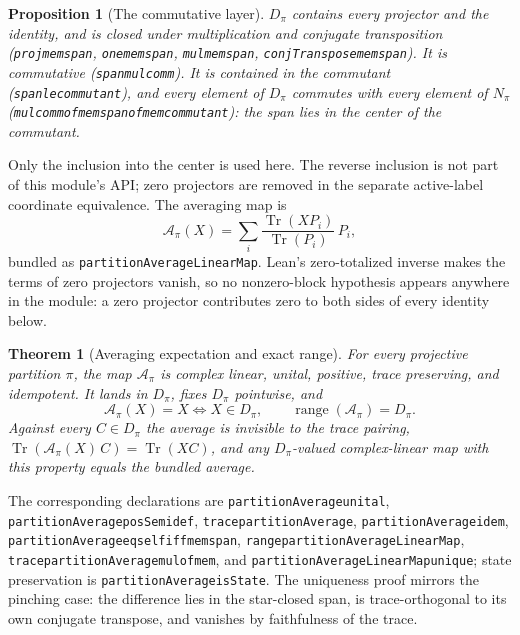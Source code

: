 \documentclass[11pt]{article}
\renewcommand{\_}{\textunderscore\allowbreak}
\newtheorem{theorem}{Theorem}
\newtheorem{proposition}{Proposition}
\theoremstyle{remark}
\newcommand{\Tr}{\operatorname{Tr}}
\newcommand{\avg}{\mathcal A}
\begin{document}
\begin{proposition}[The commutative layer]
\label{prop:span}
$D_\pi$ contains every projector and the identity, and is closed under
multiplication and conjugate transposition
(\texttt{proj\_mem\_span}, \texttt{one\_mem\_span},
\texttt{mul\_mem\_span}, \texttt{conjTranspose\_mem\_span}). It is
commutative (\texttt{span\_mul\_comm}). It is contained in the commutant
(\texttt{span\_le\_commutant}), and every element of $D_\pi$ commutes with
every element of $N_\pi$
(\texttt{mul\_comm\_of\_mem\_span\_of\_mem\_commutant}): the span lies in the
center of the commutant.
\end{proposition}

Only the inclusion into the center is used here. The reverse inclusion is not
part of this module's API; zero projectors are removed in the separate active-label
coordinate equivalence. The averaging map is
\[
 \avg_\pi(X)=\sum_i\frac{\Tr(XP_i)}{\Tr(P_i)}\,P_i,
\]
bundled as \texttt{partitionAverageLinearMap}. Lean's zero-totalized inverse
makes the terms of zero projectors vanish, so no nonzero-block hypothesis
appears anywhere in the module: a zero projector contributes zero to both
sides of every identity below.

\begin{theorem}[Averaging expectation and exact range]
\label{thm:average}
For every projective partition $\pi$, the map $\avg_\pi$ is complex linear,
unital, positive, trace preserving, and idempotent. It lands in $D_\pi$,
fixes $D_\pi$ pointwise, and
\[
 \avg_\pi(X)=X \Longleftrightarrow X\in D_\pi,
 \qquad
 \operatorname{range}(\avg_\pi)=D_\pi.
\]
Against every $C\in D_\pi$ the average is invisible to the trace pairing,
$\Tr(\avg_\pi(X)\,C)=\Tr(XC)$, and any $D_\pi$-valued complex-linear map with
this property equals the bundled average.
\end{theorem}

The corresponding declarations are
\texttt{partitionAverage\_unital},
\texttt{partitionAverage\_posSemidef},
\texttt{trace\_partitionAverage},
\texttt{partitionAverage\_idem},
\texttt{partitionAverage\_eq\_self\_iff\_mem\_span},
\texttt{range\_partitionAverageLinearMap},
\texttt{trace\_partitionAverage\_mul\_of\_mem}, and
\texttt{partitionAverageLinearMap\_unique}; state preservation is
\texttt{partitionAverage\_isState}. The uniqueness proof mirrors the pinching
case: the difference lies in the star-closed span, is trace-orthogonal to its
own conjugate transpose, and vanishes by faithfulness of the trace.
\end{document}
